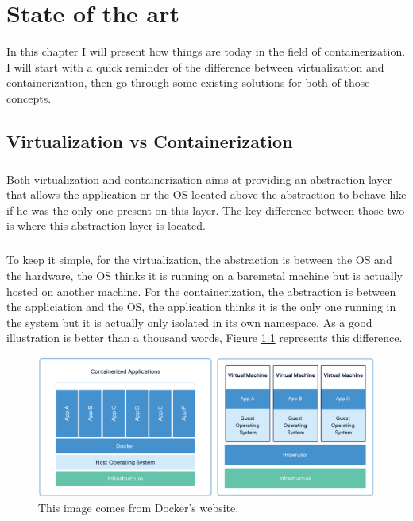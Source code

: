 \chapter{State of the art}

In this chapter I will present how things are today in the field of containerization.  I will start with a quick reminder of the difference between virtualization and containerization, then go through some existing solutions for both of those concepts.

\section{Virtualization vs Containerization}
\paragraph{}Both virtualization and containerization aims at providing an abstraction layer that allows the application or the OS located above the abstraction to behave like if he was the only one present on this layer.  The key difference between those two is where this abstraction layer is located.  

\paragraph{}To keep it simple, for the virtualization, the abstraction is between the OS and the hardware, the OS thinks it is running on a baremetal machine but is actually hosted on another machine.  For the containerization, the abstraction is between the appliciation and the OS, the application thinks it is the only one running in the system but it is actually only isolated in its own namespace.  As a good illustration is better than a thousand words, Figure \ref{fig:virt-vs-cont} represents this difference. 
\begin{figure}[!h]
  \begin{center}
    \includegraphics[width=\linewidth]{images/Virtualization-Containerization.png}
    \caption{This image comes from Docker's website\cite{docker}.}
    \label{fig:virt-vs-cont}
  \end{center}
\end{figure}

